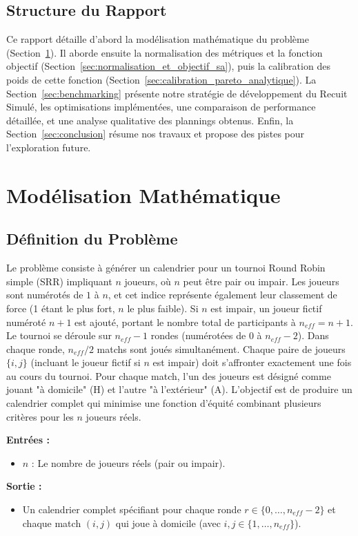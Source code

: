 \documentclass[11pt, a4paper]{article}
\begin{document}
\subsection{Structure du Rapport}
Ce rapport détaille d'abord la modélisation mathématique du problème (Section~\ref{sec:modelisation}). Il aborde ensuite la normalisation des métriques et la fonction objectif (Section~\ref{sec:normalisation_et_objectif_sa}), puis la calibration des poids de cette fonction (Section~\ref{sec:calibration_pareto_analytique}). La Section~\ref{sec:benchmarking} présente notre stratégie de développement du Recuit Simulé, les optimisations implémentées, une comparaison de performance détaillée, et une analyse qualitative des plannings obtenus. Enfin, la Section~\ref{sec:conclusion} résume nos travaux et propose des pistes pour l'exploration future.

\section{Modélisation Mathématique}
\label{sec:modelisation}
\subsection{Définition du Problème}
Le problème consiste à générer un calendrier pour un tournoi Round Robin simple (SRR) impliquant $n$ joueurs, où $n$ peut être pair ou impair. Les joueurs sont numérotés de $1$ à $n$, et cet indice représente également leur classement de force (1 étant le plus fort, $n$ le plus faible). Si $n$ est impair, un joueur fictif numéroté $n+1$ est ajouté, portant le nombre total de participants à $n_{eff} = n+1$. Le tournoi se déroule sur $n_{eff}-1$ rondes (numérotées de $0$ à $n_{eff}-2$). Dans chaque ronde, $n_{eff}/2$ matchs sont joués simultanément. Chaque paire de joueurs $\{i, j\}$ (incluant le joueur fictif si $n$ est impair) doit s'affronter exactement une fois au cours du tournoi. Pour chaque match, l'un des joueurs est désigné comme jouant "à domicile" (H) et l'autre "à l'extérieur" (A). L'objectif est de produire un calendrier complet qui minimise une fonction d'équité combinant plusieurs critères pour les $n$ joueurs réels.

\textbf{Entrées :}
\begin{itemize}
    \item $n$ : Le nombre de joueurs réels (pair ou impair).
\end{itemize}
\textbf{Sortie :}
\begin{itemize}
    \item Un calendrier complet spécifiant pour chaque ronde $r \in \{0, \dots, n_{eff}-2\}$ et chaque match $(i, j)$ qui joue à domicile (avec $i, j \in \{1, \dots, n_{eff}\}$).
\end{itemize}
\end{document}
